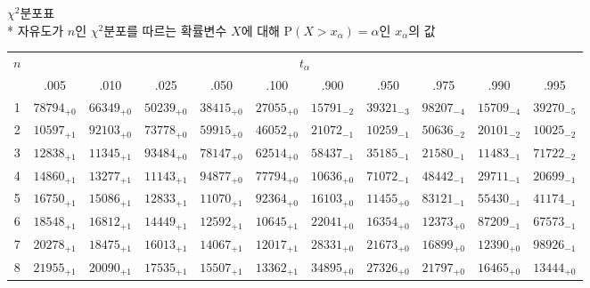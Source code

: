 \documentclass[10pt, a4paper]{article}
\begin{document}
\begin{center}
    \huge{\(\chi^{2}분포표\)}\normalsize\\
    * 자유도가 \(n\)인 \(\chi^2\)분포를 따르는 확률변수 \(X\)에 대해 \(\mathrm{P}\left(X > x_\alpha\right) = \alpha\)인 \(x_\alpha\)의 값\\
    \begin{tabular}{c || c c c c c | c c c c c}
        \multirow{2}{*}{\(n\)} & \multicolumn{10}{c}{\(t_\alpha\)} \\
                        & .005 & .010 & .025 & .050 & .100 & .900 & .950 & .975 & .990 & .995\\
        \hline\hline
        1 & \({78794}_{+0}\) & \({66349}_{+0}\) & \({50239}_{+0}\) & \({38415}_{+0}\) & \({27055}_{+0}\) & \({15791}_{-2}\) & \({39321}_{-3}\) & \({98207}_{-4}\) & \({15709}_{-4}\) & \({39270}_{-5}\)\\
        2 & \({10597}_{+1}\) & \({92103}_{+0}\) & \({73778}_{+0}\) & \({59915}_{+0}\) & \({46052}_{+0}\) & \({21072}_{-1}\) & \({10259}_{-1}\) & \({50636}_{-2}\) & \({20101}_{-2}\) & \({10025}_{-2}\)\\
        3 & \({12838}_{+1}\) & \({11345}_{+1}\) & \({93484}_{+0}\) & \({78147}_{+0}\) & \({62514}_{+0}\) & \({58437}_{-1}\) & \({35185}_{-1}\) & \({21580}_{-1}\) & \({11483}_{-1}\) & \({71722}_{-2}\)\\
        4 & \({14860}_{+1}\) & \({13277}_{+1}\) & \({11143}_{+1}\) & \({94877}_{+0}\) & \({77794}_{+0}\) & \({10636}_{+0}\) & \({71072}_{-1}\) & \({48442}_{-1}\) & \({29711}_{-1}\) & \({20699}_{-1}\)\\
        5 & \({16750}_{+1}\) & \({15086}_{+1}\) & \({12833}_{+1}\) & \({11070}_{+1}\) & \({92364}_{+0}\) & \({16103}_{+0}\) & \({11455}_{+0}\) & \({83121}_{-1}\) & \({55430}_{-1}\) & \({41174}_{-1}\)\\
        \hline
        6 & \({18548}_{+1}\) & \({16812}_{+1}\) & \({14449}_{+1}\) & \({12592}_{+1}\) & \({10645}_{+1}\) & \({22041}_{+0}\) & \({16354}_{+0}\) & \({12373}_{+0}\) & \({87209}_{-1}\) & \({67573}_{-1}\)\\
        7 & \({20278}_{+1}\) & \({18475}_{+1}\) & \({16013}_{+1}\) & \({14067}_{+1}\) & \({12017}_{+1}\) & \({28331}_{+0}\) & \({21673}_{+0}\) & \({16899}_{+0}\) & \({12390}_{+0}\) & \({98926}_{-1}\)\\
        8 & \({21955}_{+1}\) & \({20090}_{+1}\) & \({17535}_{+1}\) & \({15507}_{+1}\) & \({13362}_{+1}\) & \({34895}_{+0}\) & \({27326}_{+0}\) & \({21797}_{+0}\) & \({16465}_{+0}\) & \({13444}_{+0}\)\\

\end{tabular}
\end{center}
\end{document}
